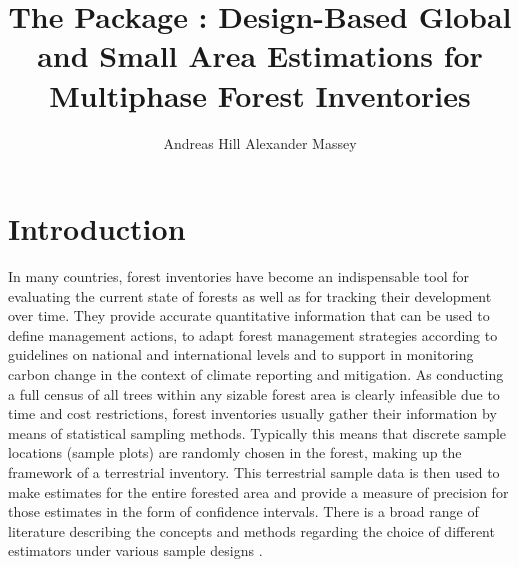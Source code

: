 \documentclass[article]{jss}
\author{Andreas Hill \And Alexander Massey}
\title{The \proglang{R} Package \pkg{forestinventory}: Design-Based Global and Small Area Estimations for Multiphase Forest Inventories}
\begin{document}
\sloppy
% 









\section{Introduction}
\label{sec:intro}


In many countries, forest inventories have become an indispensable tool for evaluating the current state of forests as well as for tracking their development over time. They provide accurate quantitative information that can be used to define management actions, to adapt forest management strategies according to guidelines on national and international levels and to support in monitoring carbon change in the context of climate reporting and mitigation. As conducting a full census of all trees within any sizable forest area is clearly infeasible due to time and cost restrictions, forest inventories usually gather their information by means of statistical sampling methods. Typically this means that discrete sample locations (sample plots) are randomly chosen in the forest, making up the framework of a terrestrial inventory.  This terrestrial sample data is then used to make estimates for the entire forested area and provide a measure of precision for those estimates in the form of confidence intervals. There is a broad range of literature describing the concepts and methods regarding the choice of different estimators under various sample designs \citep{gregoire2007, kohl2006, schreuder1993, mandallaz2008}.
\end{document}
